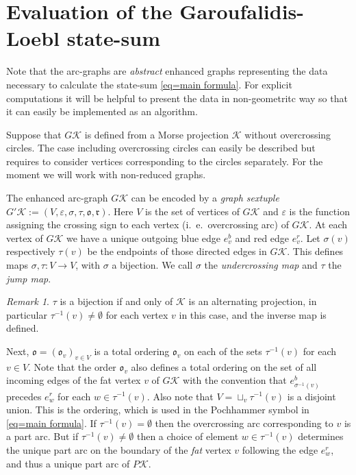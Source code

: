 \documentclass[11pt]{article}
\theoremstyle{definition}
\theoremstyle{remark}
\newtheorem*{rem}{Remark}
\theoremstyle{remark}
\begin{document}
\section{Evaluation of the Garoufalidis-Loebl state-sum}

Note that the arc-graphs are \textit{abstract} enhanced graphs representing the data necessary to calculate the state-sum \eqref{eq=main formula}. For explicit computations it will be helpful to present the data in non-geometritc way so that it can easily be implemented as an algorithm.

Suppose that $G\mathcal{K}$ is defined from a Morse projection $\mathcal{K}$ without overcrossing circles. The case including overcrossing circles can easily be described but requires to consider vertices corresponding to the circles separately. For the moment we will work with non-reduced graphs.

The enhanced arc-graph $G\mathcal{K}$ can be encoded by a \textit{graph sextuple} $G'\mathcal{K}:=(V,\varepsilon ,\sigma ,\tau ,\mathfrak{o}, \mathfrak{r})$. Here $V$ is the set of vertices of $G\mathcal{K}$ and $\varepsilon $ is the function assigning the crossing sign to each vertex (i.\ e.\ overcrossing arc) of $G\mathcal{K}$.  At each vertex of $G\mathcal{K}$ we have a unique outgoing blue edge $e_v^b$ and red edge $e_v^r$. Let $\sigma (v)$ respectively 
$\tau (v)$ be the endpoints of those directed edges in $G\mathcal{K}$. This defines maps $\sigma ,\tau : V\rightarrow V$, with $\sigma $ a bijection. 
We call $\sigma $ the \textit{undercrossing map} and $\tau $ the \textit{jump map}. 

\begin{rem} $\tau $ is a bijection if and only of $\mathcal{K}$ is an alternating projection, in particular $\tau ^{-1}(v)\neq \emptyset $ for each vertex $v$ in this case, and the inverse map is defined.  
\end{rem}

Next, $\mathfrak{o}=(\mathfrak{o}_v)_{v\in V}$ is a total ordering $\mathfrak{o}_v$ on each of the sets $\tau^{-1}(v)$ for each $v\in V$. Note that the order $\mathfrak{o}_v$ also defines a total ordering on the set of all incoming edges of the fat vertex $v$ of $G\mathcal{K}$
with the convention that $e_{\sigma ^{-1}(v)}^b$ precedes $e_w^r$ for each $w\in \tau^{-1}(v)$.
 Also note that $V=\sqcup_v \tau^{-1}(v)$ is a disjoint union.
This is the ordering, which is used in the Pochhammer symbol in \eqref{eq=main formula}.
 If $\tau^{-1}(v)=\emptyset $ then 
the overcrossing arc corresponding to $v$ is a part arc. But if $\tau^{-1}(v)\neq \emptyset $ then a choice of element $w\in \tau^{-1}(v)$ determines the unique part arc on the boundary of the \textit{fat} vertex $v$ following the edge $e_w^r$, and thus a unique part arc of $P\mathcal{K}$. 
\end{document}
